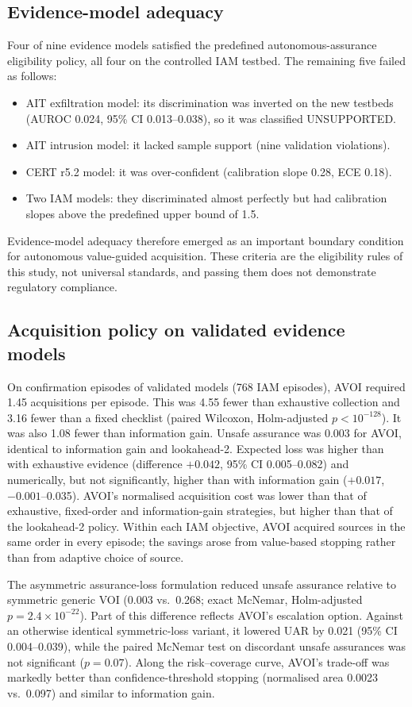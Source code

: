 \subsection{Evidence-model adequacy}
Four of nine evidence models satisfied the predefined autonomous-assurance eligibility policy, all four on the controlled
IAM testbed. The remaining five failed as follows:
\begin{itemize}
  \item AIT exfiltration model: its discrimination was inverted on the new testbeds (AUROC 0.024, 95\% CI 0.013--0.038),
    so it was classified UNSUPPORTED.
  \item AIT intrusion model: it lacked sample support (nine validation violations).
  \item CERT r5.2 model: it was over-confident (calibration slope 0.28, ECE 0.18).
  \item Two IAM models: they discriminated almost perfectly but had calibration slopes above the predefined upper bound
    of 1.5.
\end{itemize}
Evidence-model adequacy therefore emerged as an important boundary condition for autonomous value-guided acquisition.
These criteria are the eligibility rules of this study, not universal standards, and passing them does not demonstrate
regulatory compliance.

\subsection{Acquisition policy on validated evidence models}
On confirmation episodes of validated models (768 IAM episodes), AVOI required 1.45 acquisitions per episode. This was
4.55 fewer than exhaustive collection and 3.16 fewer than a fixed checklist (paired Wilcoxon, Holm-adjusted
$p<10^{-128}$). It was also 1.08 fewer than information gain. Unsafe assurance was 0.003 for AVOI, identical to
information gain and lookahead-2. Expected loss was higher than with exhaustive evidence (difference $+0.042$, 95\% CI
0.005--0.082) and numerically, but not significantly, higher than with information gain ($+0.017$, $-0.001$--0.035).
AVOI's normalised acquisition cost was lower than that of exhaustive, fixed-order and information-gain strategies, but
higher than that of the lookahead-2 policy. Within each IAM objective, AVOI acquired sources in the same order in every
episode; the savings arose from value-based stopping rather than from adaptive choice of source.

The asymmetric assurance-loss formulation reduced unsafe assurance relative to symmetric generic VOI (0.003 vs.\ 0.268;
exact McNemar, Holm-adjusted $p=2.4\times10^{-22}$). Part of this difference reflects AVOI's escalation option. Against
an otherwise identical symmetric-loss variant, it lowered UAR by 0.021 (95\% CI 0.004--0.039), while the paired McNemar
test on discordant unsafe assurances was not significant ($p=0.07$). Along the risk--coverage curve, AVOI's trade-off was
markedly better than confidence-threshold stopping (normalised area 0.0023 vs.\ 0.097) and similar to information gain.

